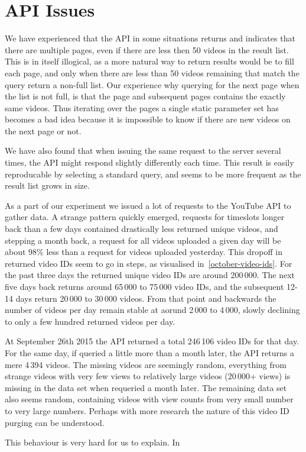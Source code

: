 \section{API Issues}
We have experienced that the API in some situations returns and indicates that
there are multiple pages, even if there are less then 50 videos in the result
list. This is in itself illogical, as a more natural way to return results would
be to fill each page, and only when there are less than 50 videos remaining that
match the query return a non-full list. Our experience why querying for the next
page when the list is not full, is that the page and subsequent pages contains 
the exactly same videos. Thus iterating over the pages a single static parameter
set has becomes a bad idea because it is impossible to know if there are new
videos on the next page or not.  %

We have also found that when issuing the same request to the server several
times, the API might respond slightly differently each time. This result is
easily reproducable by selecting a standard query, and seems to be more
frequent as the result list grows in size. %

As a part of our experiment we issued a lot of requests to the YouTube API to
gather data. A strange pattern quickly emerged, requests for timeslots longer
back than a few days contained drastically less returned unique videos, and 
stepping a month back, a request for all videos uploaded a given day will be 
about 98\% less than a request for videos uploaded yesterday. This dropoff in
returned video IDs seem to go in steps, as visualised
in~\cref{october-video-ids}. For the past three days the returned unique video
IDs are around 200\,000. The next five days back returns around 65\,000 to 75\,000
video IDs, and the subsequent 12-14 days return 20\,000 to 30\,000 videos. From
that point and backwards the number of videos per day remain stable at aorund
2\,000 to 4\,000, slowly declining to only a few hundred returned videos per day.

At September 26th 2015 the API returned a total 246\,106 video IDs for that day.
For the same day, if queried a little more than a month later, the API returns
a mere 4\,394 videos. The missing videos are seemingly random, everything from 
strange videos with very few views to relatively large videos (20\,000+ views)
is missing in the data set when requeried a month later. The remaining data set
also seems random, containing videos with view counts from very small number to
very large numbers. Perhaps with more research the nature of this video ID
purging can be understood.

This behaviour is very hard for us to explain. In 


